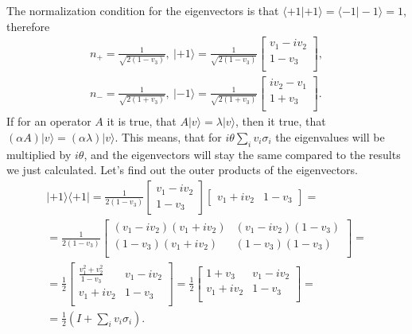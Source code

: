 \documentclass[a4paper,12pt]{article}
\newcommand{\la}{\langle}
\newcommand{\ra}{\rangle}
\begin{document}
    The normalization condition for the eigenvectors is that $\la +1 | +1 \ra = \la -1 | -1 \ra = 1$, therefore
    \begin{gather}
        \nonumber
        n_+ = \frac{1}{\sqrt{2(1 - v_3)}},\ 
        | +1 \ra = \frac{1}{\sqrt{2(1 - v_3)}}
        \begin{bmatrix}
            v_1 - iv_2\\
            1 - v_3\\
        \end{bmatrix}, \\
        n_- = \frac{1}{\sqrt{2(1 + v_3)}},\ 
        | -1 \ra = \frac{1}{\sqrt{2(1 + v_3)}}
        \begin{bmatrix}
            i v_2 - v_1\\
            1 + v_3\\
        \end{bmatrix} \textrm{.}
    \end{gather}
    If for an operator $A$ it is true, that $A | v \ra = \lambda | v \ra$, then it true, that $(\alpha A) | v \ra = (\alpha \lambda) | v \ra$. This means, that for $i \theta \sum_i v_i \sigma_i$ the eigenvalues will be multiplied by $i \theta$, and the eigenvectors will stay the same compared to the results we just calculated. Let's find out the outer products of the eigenvectors.
    \begin{gather}
        \nonumber
        | +1 \ra \la +1| = \frac{1}{2(1 - v_3)}
        \begin{bmatrix}
            v_1 - i v_2\\
            1 - v_3
        \end{bmatrix}
        \begin{bmatrix}
            v_1 + i v_2 & 1 - v_3
        \end{bmatrix}
        =\\
        \nonumber
        = \frac{1}{2(1 - v_3)}
        \begin{bmatrix}
            (v_1 - i v_2)(v_1 + i v_2) & (v_1 - i v_2)(1 - v_3)\\
            (1 - v_3)(v_1 + i v_2) & (1 - v_3)(1 - v_3)\\
        \end{bmatrix} =\\
        = \frac{1}{2}
        \nonumber
        \begin{bmatrix}
            \frac{v_1^2 + v_2^2}{1 - v_3} & v_1 - i v_2\\
            v_1 + i v_2 & 1 - v_3\\
        \end{bmatrix} = \frac{1}{2}
        \begin{bmatrix}
            1 + v_3 & v_1 - i v_2\\
            v_1 + i v_2 & 1 - v_3\\
        \end{bmatrix} =\\
        = \frac{1}{2} \left(I + \sum_i v_i \sigma_i \right) \textrm{.}
    \end{gather}
\end{document}
